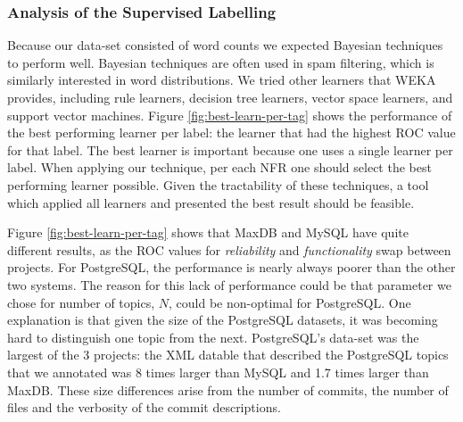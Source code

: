 \documentclass[smallextended]{svjour3}       %
\begin{document}
\subsubsection{Analysis of the Supervised Labelling}
Because our data-set consisted of word counts we expected Bayesian techniques to perform well. Bayesian techniques are often used in spam filtering, which is similarly interested in word distributions. 
We tried other learners that WEKA~\cite{weka09} provides, including rule learners, decision tree learners, vector space learners, and support vector machines.  
Figure \ref{fig:best-learn-per-tag} shows the performance of the best
performing learner per label: 
the learner that had the highest ROC value for that label. 
The best learner is important because one uses a single learner per
label. When applying our technique, per each NFR one should select the
best performing learner possible. Given the tractability of these techniques, a tool which applied all learners and presented the best result should be feasible. 

Figure \ref{fig:best-learn-per-tag} shows that MaxDB and MySQL have
quite different results, as the ROC values for \emph{reliability} and
\emph{functionality} swap between projects. For PostgreSQL, the
performance is nearly always poorer than the other two systems. The
reason for this lack of performance could be that parameter we chose for number of
topics, $N$, could be non-optimal for PostgreSQL. One explanation is that given the size of the PostgreSQL datasets, it was becoming hard to distinguish one topic
from the next. PostgreSQL's data-set was the largest of the 3 projects:
the XML datable that described the PostgreSQL topics that we
annotated was 8 times larger than MySQL and 1.7 times larger than MaxDB. These
size differences arise from the number of commits, the number of files
and the verbosity of the commit descriptions.

\end{document}
